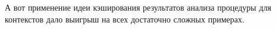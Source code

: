 А вот применение идеи кэширования результатов анализа процедуры для контекстов дало выигрыш на всех достаточно сложных примерах.


\printbibliography[
    heading=bibintoc%
    ,title=Библиография %
]

